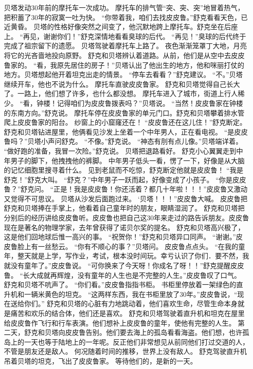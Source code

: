 \documentclass[a4paper,12pt,UTF8,twoside]{ctexbook}
\begin{document}
        贝塔发动30年前的摩托车一次成功。 
        摩托车的排气管“突、突、突”地冒着热气，把积蓄了30年的寂寞一吐为快。 
        “你带着我，咱们去找皮皮鲁。”舒克看看天色，已近黄昏。 
        贝塔的性格好像突然之间变了，他沉默地跨上摩托车。舒克坐在后座上。 
        “再见，谢谢你们！”舒克深情地看看臭球的后代。 
        “再见！”臭球的后代终于完成了祖宗留下的遗愿。 
        贝塔驾驶着摩托车上路了。 
        夜色渐渐笼罩丁大地，月亮将它的光吝啬地投向原野。 
         舒克和贝塔辨认着道路。从前，他们是从空中去皮皮鲁家的。 
        “看，我原先居住的房子！”贝塔认出了他出生的地方，他和咪丽打仗的地方。贝塔想起他开着坦克出走的情景。 
        “停车去看看？”舒克建议。 
        “不。”贝塔继续开车，他也不说为什么。 
        摩托车直驶皮皮鲁家。 
        舒克和贝塔觉得自己长大了。一路上，他们想了许多，也什么都没想。 
        摩托车进入了城市，街道上行人稀少。 
        “看，钟楼！记得咱们为皮皮鲁拨表吗？”贝塔说。 
        “当然！皮皮鲁家在钟楼的东南方向。”舒克说。 
        摩托车停在皮皮鲁家的单元门口。舒克和贝塔攀着排水管爬上皮皮鲁家的阳台。 
        纱窗上的小窟窿还在！ 
        “皮皮鲁还在这儿住！”舒克断定。 
        舒克和贝塔钻进屋里，他俩看见沙发上坐着一个中年男人，正在看电视。 
        “是皮皮鲁吗？”贝塔小声问舒克。 
        “不像。”舒克说。 
        “神态有刖有点儿像。”贝塔端详着。 
        “做好跑的准备，我冒一次险。”舒克说。 
        贝塔把退路看好。 
        舒克小心翼翼走到中年男子的脚下，他拽拽他的裤脚。 
        中年男子低头一看，愣了一下，好像是从大脑的记忆细胞里搜寻着什么。 
        见到老鼠而不吃惊，舒克断定他就是皮皮鲁！ 
        “我是舒克！”舒克大叫。 
        “舒克？”中年男子一跃而起，好像变成了小孩子。 
        “你是皮皮鲁？”舒克问。 
        “正是！我是皮皮鲁！你还活着？都几十年啦！！！”皮皮鲁又激动又觉得不可思议。 
        贝塔从沙发后面跑过来。 
        ‘贝塔！！！”皮皮鲁大喊。 
        皮皮鲁把舒克和贝塔捧在手掌上，他看着自己童年时的朋友，眼睛湿润了。 
        舒克和贝塔把分别后的经历讲给皮皮鲁听。皮皮鲁也把自己这30年来走过的路告诉朋友。皮皮鲁现在是著名的物理学家，去年曾获得了诺贝尔奖的提名。 
        舒克和贝塔高兴极了，这是他们回地球后惟一高兴的事。 
        “祝贺你！”舒克和贝塔异口同声。 
        “谢谢。”皮皮鲁脸上有一丝愁云。 
        “你有不顺心的事？”贝塔问。 
        皮皮鲁点点头。 
        “在我的童年，整天就是上学，写作业，考试，根本没时间玩。幸亏认识了你们．要不然，我就没有童年了。”皮皮鲁说。 
        “可你换来了今天呀！你成名了呀！！”舒克提醒皮皮鲁。 
        “长大成就再辉煌，没有童年的人生也是不完整的人生。”皮皮鲁叹了口气。 
        舒克和贝塔不吭声了。 
        “你们看。”皮皮鲁指指书柜。 
        书柜里停放着一架绿色的直升机和一辆米黄色的坦克。 
        “这两样东西，我在书柜里放了30年。”皮皮鲁说，“现在送给你们。” 
        舒克和贝塔的心脏有力地跳动着，他们喜欢生命，尽管生命本身就是痛苦和欢乐的结合体，他们还是喜欢。 
        舒克和贝塔驾驶着直升机和坦克在屋里给皮皮鲁作飞行和行车表演。他们想补上皮皮鲁的童年，使他有完整的人生。 
        第二天，舒克和贝塔向皮皮鲁告别。他们要去海上的孤岛看看海盗。他们想，也许孤岛上的一天也等于陆地上的一年呢。反正他们非常想见从前同他们打过交道的人，不管是朋友还是敌人。 
        何况随着时间的推移，世界上没有敌人。 
        舒克驾驶直升机吊着贝塔的坦克，飞出了皮皮鲁家。 
        等待他们的，是新的一天。   

\backmatter
      
\end{document}
